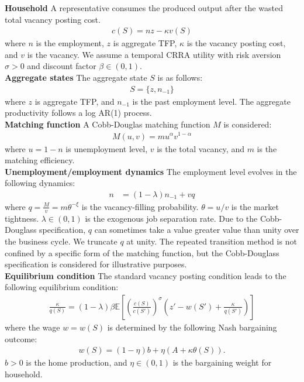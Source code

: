 \noindent\textbf{Household}\hspace{3mm} A representative consumes the produced output after the wasted total vacancy posting cost.
\begin{align*}
  c(S) = nz - \kappa v(S)
\end{align*}
where $n$ is the employment, $z$ is aggregate TFP, $\kappa$ is the vacancy posting cost, and $v$ is the vacancy. We assume a temporal CRRA utility with risk aversion $\sigma>0$ and discount factor $\beta\in(0,1)$.
\\

\noindent\textbf{Aggregate states} \hspace{3mm} The aggregate state $S$ is as follows:
\begin{align*}
  S = \{z,n{_{-1}}\}
\end{align*}
where $z$ is aggregate TFP, and $n_{-1}$ is the past employment level. The aggregate productivity follows a log AR(1) process.
\\

\noindent\textbf{Matching function} \hspace{3mm} A Cobb-Douglas matching function $M$ is considered:
\begin{align*}
  M(u,v) = m u^{\alpha}v^{1-\alpha}
\end{align*}
where $u=1-n$ is unemployment level, $v$ is the total vacancy, and $m$ is the matching efficiency.
\\

\noindent\textbf{Unemployment/employment dynamics} \hspace{3mm} The employment level evolves in the following dynamics:
\begin{align*}
  n &= (1-\lambda)n_{-1}+ vq
\end{align*}
where $q = \frac{M}{v} = m \theta^{-\xi}$ is the vacancy-filling probability. $\theta=u/v$ is the market tightness. $\lambda\in(0,1)$ is the exogenous job separation rate.
Due to the Cobb-Douglass specification, $q$ can sometimes take a value greater value than unity over the business cycle. We truncate $q$ at unity. The repeated transition method is not confined by a specific form of the matching function, but the Cobb-Douglass specification is considered for illustrative purposes.
\\

\noindent\textbf{Equilibrium condition}\hspace{3mm} The standard vacancy posting condition leads to the following equilibrium condition:
\begin{align*}
  \frac{\kappa}{q(S)} = (1-\lambda)\beta\mathbb{E}\left[\left(\frac{c(S)}{c(S')}\right)^{\sigma}
  \left(z' - w(S') + \frac{\kappa}{q(S')}\right)\right]
\end{align*}
where the wage $w=w(S)$ is determined by the following Nash bargaining outcome:
\begin{align*}
  w(S) = (1-\eta)b + \eta (A + \kappa\theta(S)).
\end{align*}
$b>0$ is the home production, and $\eta\in(0,1)$ is the bargaining weight for household.